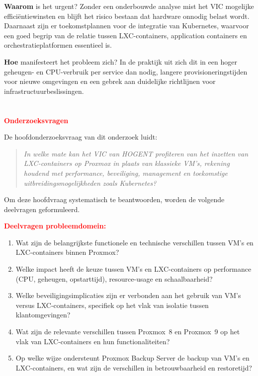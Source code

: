 \textbf{Waarom} is het urgent? Zonder een onderbouwde analyse mist het VIC mogelijke efficiëntiewinsten en blijft het risico bestaan dat hardware onnodig belast wordt. Daarnaast zijn er toekomstplannen voor de integratie van Kubernetes, waarvoor een goed begrip van de relatie tussen LXC-containers, application containers en orchestratieplatformen essentieel is.

\textbf{Hoe} manifesteert het probleem zich? In de praktijk uit zich dit in een hoger geheugen- en CPU-verbruik per service dan nodig, langere provisioneringstijden voor nieuwe omgevingen en een gebrek aan duidelijke richtlijnen voor infrastructuurbeslissingen.

\section{}%
\label{sec:onderzoeksvraag}

\textcolor{red}{\textbf{Onderzoeksvragen}}

De hoofdonderzoeksvraag van dit onderzoek luidt:

\begin{quote}
\textit{In welke mate kan het VIC van HOGENT profiteren van het inzetten van LXC-containers op Proxmox in plaats van klassieke VM's, rekening houdend met performance, beveiliging, management en toekomstige uitbreidingsmogelijkheden zoals Kubernetes?}
\end{quote}

Om deze hoofdvraag systematisch te beantwoorden, worden de volgende deelvragen geformuleerd.

\textcolor{red}{\textbf{Deelvragen probleemdomein:}}

\begin{enumerate}
    \item Wat zijn de belangrijkste functionele en technische verschillen tussen VM's en LXC-containers binnen Proxmox?
    \item Welke impact heeft de keuze tussen VM's en LXC-containers op performance (CPU, geheugen, opstarttijd), resource-usage en schaalbaarheid?
    \item Welke beveiligingsimplicaties zijn er verbonden aan het gebruik van VM's versus LXC-containers, specifiek op het vlak van isolatie tussen klantomgevingen?
    \item Wat zijn de relevante verschillen tussen Proxmox~8 en Proxmox~9 op het vlak van LXC-containers en hun functionaliteiten?
    \item Op welke wijze ondersteunt Proxmox Backup Server de backup van VM's en LXC-containers, en wat zijn de verschillen in betrouwbaarheid en restoretijd?
\end{enumerate}

